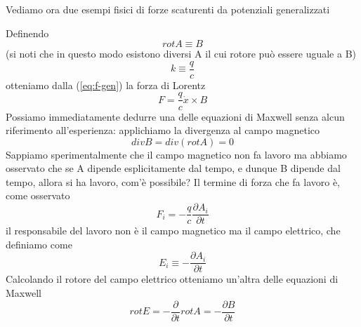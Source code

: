 \documentclass[
10pt, %
a4paper, %
oneside, %
headinclude,footinclude, %
BCOR5mm, %
]{scrartcl}
\begin{document}
Vediamo ora due esempi fisici di forze scaturenti da potenziali generalizzati
\begin{esempio}
	Definendo
	\[rotA\equiv B\]
	(si noti che in questo modo esistono diversi A il cui rotore può essere uguale a B)
	\[k \equiv \frac{q}{c}\]
	 otteniamo dalla (\ref{eq:f-gen}) la forza di Lorentz
	\[F = \frac{q}{c}\dot{x}\times B\]
	Possiamo immediatamente dedurre una delle equazioni di Maxwell senza alcun riferimento all'esperienza: applichiamo la divergenza al campo magnetico
	\[div B = div(rotA) = 0\]
	Sappiamo sperimentalmente che il campo magnetico non fa lavoro ma abbiamo osservato che se A dipende esplicitamente dal tempo, e dunque B dipende dal tempo, allora si ha lavoro, com'è possibile? Il termine di forza che fa lavoro è, come osservato
	\[F_i = -\frac{q}{c}\frac{\partial A_i}{\partial t}\]
	il responsabile del lavoro non è il campo magnetico ma il campo elettrico, che definiamo come
	\[E_i \equiv -\frac{\partial A_i}{\partial t}\]
	Calcolando il rotore del campo elettrico otteniamo un'altra delle equazioni di Maxwell
	\[rot E = -\frac{\partial }{\partial t}rotA = -\frac{\partial B}{\partial t} \]
\end{esempio}
\end{document}
